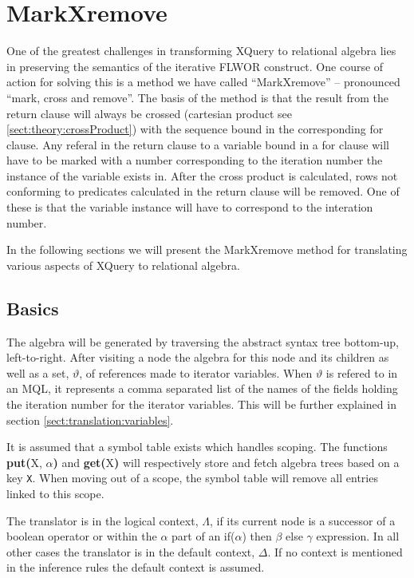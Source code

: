\section{MarkXremove}
\label{sect:translation:markXremove}

One of the greatest challenges in transforming XQuery to relational algebra
lies in preserving the semantics of the iterative FLWOR construct. One
course of action for solving this is a method we have called ``MarkXremove'' --
pronounced ``mark, cross and remove''. The basis of the method is that the
result from the \textsf{return} clause will always be crossed (cartesian product
see \ref{sect:theory:crossProduct}) with the sequence bound in the
corresponding \textsf{for} clause. Any referal in the \textsf{return} clause to a
variable bound in a \textsf{for} clause will have to be marked with a number
corresponding to the iteration number the instance of the variable exists in.
After the cross product is calculated, rows not conforming to predicates
calculated in the \textsf{return} clause will be removed. One of these is that
the variable instance will have to correspond to the interation number.

In the following sections we will present the MarkXremove method for
translating various aspects of XQuery to relational algebra.

\subsection{Basics}
The algebra will be generated by traversing the abstract syntax tree bottom-up,
left-to-right. After visiting a node the algebra for this node and its children
as well as a set, $\vartheta$, of references made to iterator variables. When
$\vartheta$ is refered to in an MQL, it represents a comma separated list of
the names of the fields holding the iteration number for the iterator
variables. This will be further explained in section
\ref{sect:translation:variables}.

It is assumed that a symbol table exists which handles scoping. The functions
\textbf{put(}\textsf{X}, $\alpha$\textbf{)} and \textbf{get(}\textsf{X}\textbf{)}
will respectively store and fetch algebra trees based on a key \verb!X!. When
moving out of a scope, the symbol table will remove all entries linked to this scope.

The translator is in the logical context, $\Lambda$, if its current node is a
successor of a boolean operator or within the $\alpha$ part of an
\textsf{if($\alpha$) then $\beta$ else $\gamma$} expression. In all other cases
the translator is in the default context, $\Delta$. If no context is mentioned
in the inference rules the default context is assumed.

